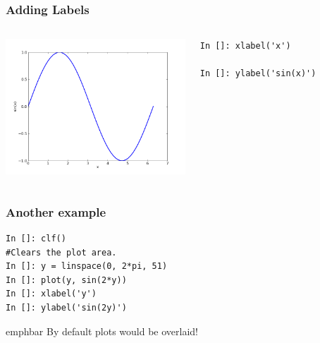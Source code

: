 \documentclass[14pt,compress]{beamer}
\newcommand{\emphbar}[1]
{\begin{beamercolorbox}[rounded=true]{emphbar} 
      {#1}
 \end{beamercolorbox}
}
\newcommand{\typ}[1]{\lstinline{#1}}
\begin{document}
\begin{frame}[fragile]
\frametitle{Adding Labels}
\begin{columns}
  \hspace*{-0.45in}
  \includegraphics[height=2in, interpolate=true]{data/label}  
  \hspace*{0.5in}
  \begin{block}{}
  \small
  \begin{lstlisting}
In []: xlabel('x')

In []: ylabel('sin(x)')
  \end{lstlisting}
  \small

  \end{block}
\end{columns}
\end{frame}

\begin{frame}[fragile]
\frametitle{Another example}
  \begin{lstlisting}
In []: clf()
#Clears the plot area.
In []: y = linspace(0, 2*pi, 51)
In []: plot(y, sin(2*y))
In []: xlabel('y')
In []: ylabel('sin(2y)')
  \end{lstlisting}
\emphbar{By default plots would be overlaid!}
\end{frame}
\end{document}
